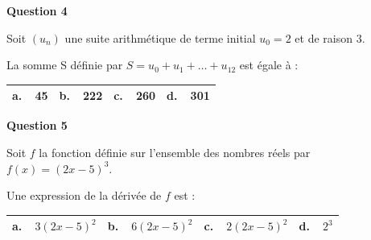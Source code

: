 \textbf{Question 4}

\medskip

Soit $\left(u_n\right)$ une suite arithmétique de terme initial $u_0 = 2$ et de raison $3$.

La somme S définie par $S = u_0 + u_1 +\ldots + u_{12}$ est égale à :

\begin{center}
\begin{tabularx}{\linewidth}{|*{4}{X|}}\hline
\textbf{a.~~}45&\textbf{b.~~}222&\textbf{c.~~}260&\textbf{d.~~}301\\ \hline
\end{tabularx}
\end{center} 

\textbf{Question 5}

\medskip

Soit $f$ la fonction définie sur l'ensemble des nombres réels par $f(x) = (2x - 5)^3$.

Une expression de la dérivée de $f$ est :

\begin{center}
\begin{tabularx}{\linewidth}{|*{4}{X|}}\hline
\textbf{a.~~}$3(2x- 5)^2$&\textbf{b.~~}$6(2x- 5)^2$&\textbf{c.~~}$2(2x- 5)^2$&\textbf{d.~~}$2^3$\\ \hline
\end{tabularx}
\end{center} 

\medskip
